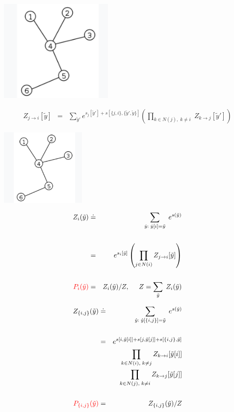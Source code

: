 {

\centerline{\includegraphics[height=2.0in]{../images/Tree}}

\vfill
\begin{eqnarray*}
  Z_{j\rightarrow i}[\tilde{y}] & = & \sum_{\tilde{y}'}  e^{s_j[\tilde{y}'] + s[\{j,i\},\{\tilde{y}',\tilde{y}\}]}
    \left(\prod_{k \in N(j),\;k \not = i}\;Z_{k\rightarrow j}[\tilde{y}']\right)
\end{eqnarray*}


\centerline{\includegraphics[height=1.5in]{../images/Tree}}

\begin{eqnarray*}
Z_i(\tilde{y}) & \doteq & \sum_{\hat{y}:\; \hat{y}[i] = \tilde{y}} \;e^{s(\hat{y})} \\
\\
& = & e^{s_i[\tilde{y}]} \left(\prod_{j\in N(i)} Z_{j \rightarrow i}[\tilde{y}]\right) \\
\\
{\color{red} P_i(\tilde{y})} & = & Z_i(\tilde{y})/Z,\;\;\;\;\; Z = \sum_{\tilde{y}}\;Z_i(\tilde{y})
\end{eqnarray*}



\begin{eqnarray*}
Z_{\{i,j\}}(\tilde{y}) & \doteq & \sum_{\hat{y}:\; \hat{y}[\{i,j\}] = \tilde{y}} \;e^{s(\hat{y})} \\
\\
& = & e^{s[i,\tilde{y}[i]] + s[j,\tilde{y}[j]] +s[\{i,j\},\tilde{y}]} \\
& & \prod_{k\in N(i),\;k \not = j} Z_{k \rightarrow i}[\tilde{y}[i]] \\
& & \prod_{k\in N(j),\;k \not = i} Z_{k \rightarrow j}[\tilde{y}[j]] \\
\\
{\color{red} P_{\{i,j\}}(\tilde{y})} & = & Z_{\{i,j\}}(\tilde{y})/Z
\end{eqnarray*}

}
